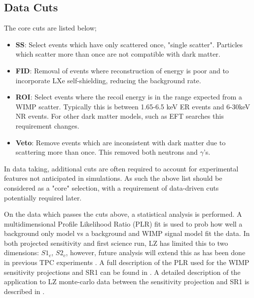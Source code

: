 \par
\subsection{Data Cuts}
\par
The core cuts are listed below;
\begin{itemize}
    \item \textbf{SS}: Select events which have only scattered once, "single scatter". Particles which scatter more than once are not compatible with dark matter.
    \item \textbf{FID}: Removal of events where reconstruction of energy is poor and to incorporate LXe self-shielding, reducing the background rate.
    \item \textbf{ROI}: Select events where the recoil energy is in the range expected from a WIMP scatter. Typically this is between 1.65-6.5 keV ER events and 6-30keV NR events. For other dark matter models, such as EFT searches this requirement changes.
    \item \textbf{Veto}: Remove events which are inconsistent with dark matter due to scattering more than once. This removed both neutrons and $\gamma$'s.
\end{itemize}
In data taking, additional cuts are often required to account for experimental features not anticipated in simulations.
As such the above list should be considered as a "core" selection, with a requirement of data-driven cuts potentially required later.

\par
On the data which passes the cuts above, a statistical analysis is performed.
A multidimensional Profile Likelihood Ratio (PLR) fit is used to prob how well a background only model vs a background and WIMP signal model fit the data.
In both projected sensitivity and first science run, LZ has limited this to two dimensions: {$S1_c$, $S2_c$}, however, future analysis will extend this as has been done in previous TPC experiments \cite{LUX_RUN1_EFT_2021,LUX_RUN4_EFT_2021,shaunalsum_thesis_ref}.
A full description of the PLR used for the WIMP sensitivity projections and SR1 can be found in \cite{LZ_Ibles_LZStats_Thesis_ref}. 
A detailed description of the application to LZ monte-carlo data between the sensitivity projection and SR1 is described in \cite{jonathannikoleyczik_thesis_ref}.
